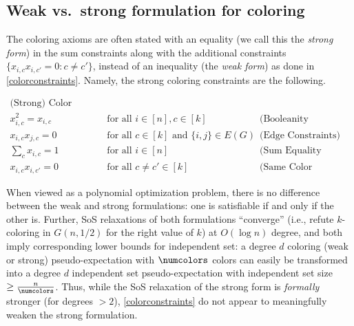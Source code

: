 \subsection{Weak vs.\ strong formulation for coloring} \label{sec:weak-vs-strong}
The coloring axioms are often stated with an equality (we call this the \emph{strong form}) in the sum constraints along with the additional constraints $\{x_{i,c} x_{i,c'} = 0 : c \ne c'\}$, instead of an inequality (the \emph{weak form}) as done in \cref{colorconstraints}. Namely, the strong coloring constraints are the following.
\begin{center}
\begin{subequations}
\boxed{
\begin{aligned}
\text{(Strong) Color Constraints} \\
x_{i,c}^2 = x_{i,c} &\text{ for all } i \in [n], c \in [k] & \ \text{(Booleanity Constraints)} \\
x_{i,c} x_{j,c} = 0 &\text{ for all } c\in [k] \text{ and } \{i,j\} \in E(G) & \ \text{(Edge Constraints)}  \\
\sum_{c} x_{i,c} = 1 &\text{ for all } i \in [n] & \ \text{(Sum Equality Constraints)} \\
x_{i,c} x_{i,c'} = 0 &\text{ for all } c \ne c' \in [k] & \ \text{(Same Color Constraints)}
\end{aligned}
}
\end{subequations}
\end{center}
When viewed as a polynomial optimization problem, there is no difference between the weak and strong formulations: one is satisfiable if and only if the other is. Further, SoS relaxations of both formulations ``converge'' (i.e., refute $k$-coloring in $G(n,1/2)$ for the right value of $k$) at $O(\log n)$ degree, and both imply corresponding lower bounds for independent set: a degree $d$ coloring (weak or strong) pseudo-expectation with $\numcolors$ colors can easily be transformed into a degree $d$ independent set pseudo-expectation with independent set size $\geq \frac{n}{\numcolors}$. Thus, while the SoS relaxation of the strong form is \emph{formally} stronger (for degrees $>2$), \cref{colorconstraints} do not appear to meaningfully weaken the strong formulation. 

